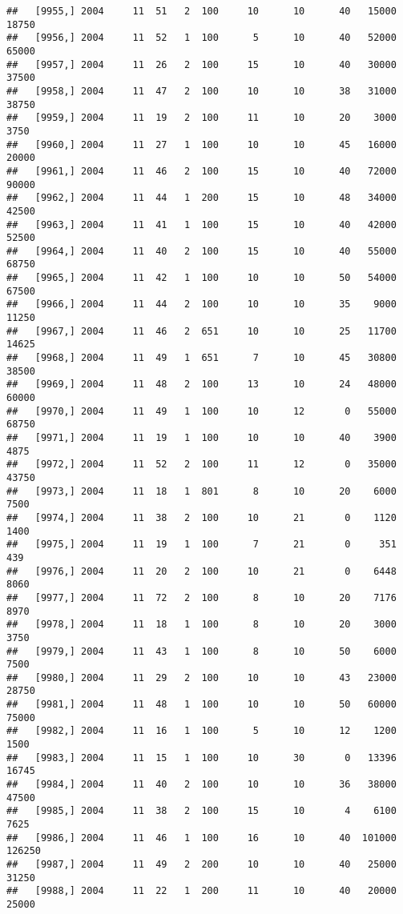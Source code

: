 \documentclass{article}\usepackage[]{graphicx}\usepackage[]{color}
\makeatletter
\newenvironment{kframe}{%
 \def\at@end@of@kframe{}%
 \ifinner\ifhmode%
  \def\at@end@of@kframe{\end{minipage}}%
  \begin{minipage}{\columnwidth}%
 \fi\fi%
 \def\FrameCommand##1{\hskip\@totalleftmargin \hskip-\fboxsep
 \colorbox{shadecolor}{##1}\hskip-\fboxsep
     \hskip-\linewidth \hskip-\@totalleftmargin \hskip\columnwidth}%
 \MakeFramed {\advance\hsize-\width
   \@totalleftmargin\z@ \linewidth\hsize
   \@setminipage}}%
 {\par\unskip\endMakeFramed%
 \at@end@of@kframe}
\newenvironment{knitrout}{}{} %
\makeatother
\begin{document}
\begin{knitrout}
\begin{kframe}
\begin{verbatim}
##   [9955,] 2004     11  51   2  100     10      10      40   15000   18750
##   [9956,] 2004     11  52   1  100      5      10      40   52000   65000
##   [9957,] 2004     11  26   2  100     15      10      40   30000   37500
##   [9958,] 2004     11  47   2  100     10      10      38   31000   38750
##   [9959,] 2004     11  19   2  100     11      10      20    3000    3750
##   [9960,] 2004     11  27   1  100     10      10      45   16000   20000
##   [9961,] 2004     11  46   2  100     15      10      40   72000   90000
##   [9962,] 2004     11  44   1  200     15      10      48   34000   42500
##   [9963,] 2004     11  41   1  100     15      10      40   42000   52500
##   [9964,] 2004     11  40   2  100     15      10      40   55000   68750
##   [9965,] 2004     11  42   1  100     10      10      50   54000   67500
##   [9966,] 2004     11  44   2  100     10      10      35    9000   11250
##   [9967,] 2004     11  46   2  651     10      10      25   11700   14625
##   [9968,] 2004     11  49   1  651      7      10      45   30800   38500
##   [9969,] 2004     11  48   2  100     13      10      24   48000   60000
##   [9970,] 2004     11  49   1  100     10      12       0   55000   68750
##   [9971,] 2004     11  19   1  100     10      10      40    3900    4875
##   [9972,] 2004     11  52   2  100     11      12       0   35000   43750
##   [9973,] 2004     11  18   1  801      8      10      20    6000    7500
##   [9974,] 2004     11  38   2  100     10      21       0    1120    1400
##   [9975,] 2004     11  19   1  100      7      21       0     351     439
##   [9976,] 2004     11  20   2  100     10      21       0    6448    8060
##   [9977,] 2004     11  72   2  100      8      10      20    7176    8970
##   [9978,] 2004     11  18   1  100      8      10      20    3000    3750
##   [9979,] 2004     11  43   1  100      8      10      50    6000    7500
##   [9980,] 2004     11  29   2  100     10      10      43   23000   28750
##   [9981,] 2004     11  48   1  100     10      10      50   60000   75000
##   [9982,] 2004     11  16   1  100      5      10      12    1200    1500
##   [9983,] 2004     11  15   1  100     10      30       0   13396   16745
##   [9984,] 2004     11  40   2  100     10      10      36   38000   47500
##   [9985,] 2004     11  38   2  100     15      10       4    6100    7625
##   [9986,] 2004     11  46   1  100     16      10      40  101000  126250
##   [9987,] 2004     11  49   2  200     10      10      40   25000   31250
##   [9988,] 2004     11  22   1  200     11      10      40   20000   25000

\end{verbatim}
\end{kframe}
\end{knitrout}
\end{document}
